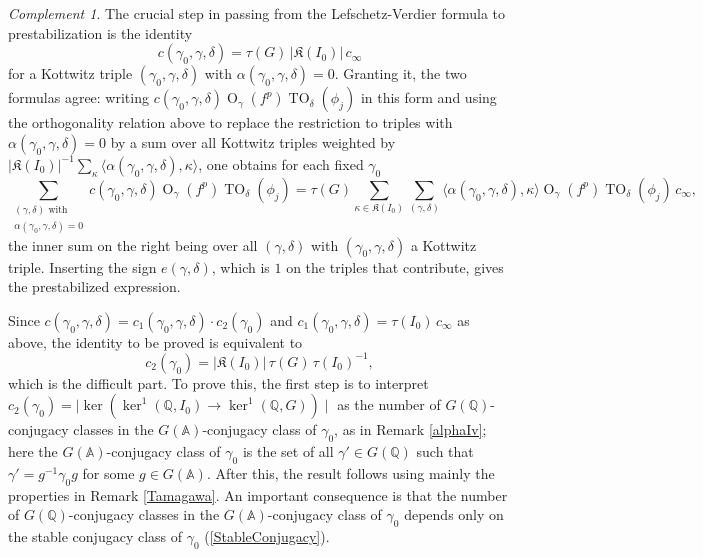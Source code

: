 \documentclass[11pt,a4paper]{article}
\theoremstyle{definition}
\theoremstyle{plain}
\theoremstyle{remark}
\newtheorem{Rc}[shared]{Complement}
\theoremstyle{plain}
\DeclareMathOperator{\Or}{O}
\DeclareMathOperator{\TO}{TO}
\begin{document}
\begin{Rc}\label{prestabkey}
    The crucial step in passing from the Lefschetz-Verdier formula to prestabilization is the identity
    $$c(\gamma_0, \gamma, \delta) = \tau(G)\,\lvert \mathfrak{K}(I_0) \rvert\,c_{\infty}$$
    for a Kottwitz triple $(\gamma_0, \gamma, \delta)$ with $\alpha(\gamma_0, \gamma, \delta) = 0$. Granting it, the two formulas agree: writing $c(\gamma_0,\gamma,\delta) \Or_{\gamma}(f^p) \TO_{\delta}(\phi_j)$ in this form and using the orthogonality relation above to replace the restriction to triples with $\alpha(\gamma_0, \gamma, \delta) = 0$ by a sum over all Kottwitz triples weighted by $\lvert \mathfrak{K}(I_0) \rvert^{-1} \sum_{\kappa} \langle \alpha(\gamma_0, \gamma, \delta), \kappa \rangle$, one obtains for each fixed $\gamma_0$
    $$\sum_{\substack{(\gamma, \delta) \text{ with } \\ \alpha(\gamma_0,\gamma,\delta) = 0}} c(\gamma_0, \gamma, \delta) \Or_{\gamma}(f^p) \TO_{\delta}(\phi_j) = \tau(G) \sum_{\kappa \in \mathfrak{K}(I_0)} \sum_{(\gamma, \delta)} \langle \alpha(\gamma_0, \gamma, \delta), \kappa \rangle \Or_{\gamma}(f^p) \TO_{\delta}(\phi_j) \, c_{\infty},$$
    the inner sum on the right being over all $(\gamma,\delta)$ with $(\gamma_0, \gamma, \delta)$ a Kottwitz triple. Inserting the sign $e(\gamma,\delta)$, which is $1$ on the triples that contribute, gives the prestabilized expression.

    Since $c(\gamma_0, \gamma, \delta) = c_1(\gamma_0,\gamma,\delta) \cdot c_2(\gamma_0)$ and $c_1(\gamma_0,\gamma,\delta) = \tau(I_0) \, c_{\infty}$ as above, the identity to be proved is equivalent to
    $$c_2(\gamma_0) = \lvert \mathfrak{K}(I_0) \rvert\,\tau(G)\,\tau(I_0)^{-1},$$
    which is the difficult part. To prove this, the first step is to interpret $c_2(\gamma_0) = \mid \ker (\ker^1 (\mathbb{Q}, I_0) \xrightarrow[]{} \ker^1(\mathbb{Q},G)) \mid$ as the number of $G(\mathbb{Q})$-conjugacy classes in the $G(\mathbb{A})$-conjugacy class of $\gamma_0$, as in Remark \ref{alphaIv}; here the $G(\mathbb{A})$-conjugacy class of $\gamma_0$ is the set of all $\gamma' \in G(\mathbb{Q})$ such that $\gamma' = g^{-1} \gamma_0 g$ for some $g \in G(\mathbb{A})$. After this, the result follows using mainly the properties in Remark \ref{Tamagawa}. An important consequence is that the number of $G(\mathbb{Q})$-conjugacy classes in the $G(\mathbb{A})$-conjugacy class of $\gamma_0$ depends only on the stable conjugacy class of $\gamma_0$ (\ref{StableConjugacy}).
\end{Rc}
\end{document}
